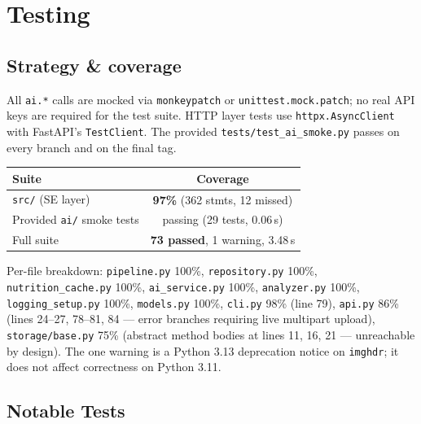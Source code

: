\documentclass[11pt,a4paper]{article}
\begin{document}
\section{Testing}\label{sec:testing}

\subsection{Strategy \& coverage}

All \texttt{ai.*} calls are mocked via \texttt{monkeypatch} or \texttt{unittest.mock.patch}; no real API keys are required for the test suite. HTTP layer tests use \texttt{httpx.AsyncClient} with FastAPI's \texttt{TestClient}. The provided \texttt{tests/test\_ai\_smoke.py} passes on every branch and on the final tag.

\begin{center}\small
\begin{tabular}{lc}
\toprule
\textbf{Suite} & \textbf{Coverage} \\
\midrule
\texttt{src/} (SE layer) & \textbf{97\%} (362 stmts, 12 missed) \\
Provided \texttt{ai/} smoke tests & passing (29 tests, 0.06\,s) \\
Full suite & \textbf{73 passed}, 1 warning, 3.48\,s \\
\bottomrule
\end{tabular}
\end{center}

Per-file breakdown: \texttt{pipeline.py} 100\%, \texttt{repository.py} 100\%, \texttt{nutrition\_cache.py} 100\%, \texttt{ai\_service.py} 100\%, \texttt{analyzer.py} 100\%, \texttt{logging\_setup.py} 100\%, \texttt{models.py} 100\%, \texttt{cli.py} 98\% (line 79), \texttt{api.py} 86\% (lines 24--27, 78--81, 84 --- error branches requiring live multipart upload), \texttt{storage/base.py} 75\% (abstract method bodies at lines 11, 16, 21 --- unreachable by design). The one warning is a Python 3.13 deprecation notice on \texttt{imghdr}; it does not affect correctness on Python 3.11.

\subsection{Notable Tests}
\end{document}
